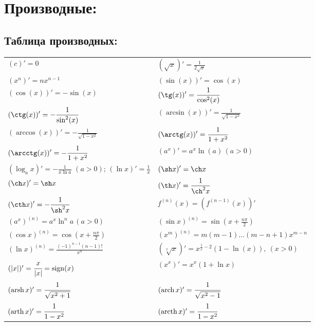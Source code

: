\documentclass[12pt, a6paper]{extarticle}
\DeclareMathOperator{\sign}{sign}
\DeclareMathOperator{\arch}{arch}
\DeclareMathOperator{\arsh}{arsh}
\DeclareMathOperator{\arth}{arth}
\DeclareMathOperator{\arcth}{arcth}
\begin{document}
\section{Производные:}
\subsection{Таблица производных:}
\begin{tabular}{ll}
$\displaystyle (c)' = 0 $                       &   $\displaystyle (\sqrt{x})'=\frac{1}{2\sqrt{x}}      $ \\
$\displaystyle (x^n)'=nx^{n-1}$                 &   $\displaystyle (\sin(x))'=\cos(x)                          $ \\
$\displaystyle (\cos(x))'=-\sin(x)$             &   $\displaystyle (\tg(x))'=\frac{1}{\cos^2(x)}               $ \\
$\displaystyle (\ctg(x))'=-\frac{1}{\sin^2(x)}$ &   $\displaystyle (\arcsin(x))'=\frac{1}{\sqrt{1-x^2}}  	     $ \\
$\displaystyle (\arccos(x))'=-\frac{1}{\sqrt{1-x^2}}  	$ &   $\displaystyle (\arctg(x))'=\frac{1}{1+x^2}  	   $ \\
$\displaystyle (\arcctg(x))'=-\frac{1}{1+x^2}  	$ &   $\displaystyle (a^x)'=a^x\ln(a) \, (a>0)     $ \\
$\displaystyle (\log_ax)'=-\frac{1}{x\ln a}\,\,(a>0);\,(\ln x)'=\frac{1}{x}  $ &  $\displaystyle (\sh x)'=\ch x  $ \\
$\displaystyle (\ch x)'=\sh x  $ &  $\displaystyle (\th x)'=\frac{1}{\ch^2 x}                                                        $ \\
$\displaystyle (\cth x)'=-\frac{1}{\sh^2 x}  $ &  $\displaystyle f^{(n)}(x)=(f^{(n-1)}(x))'                                       $ \\
$\displaystyle (a^x)^{(n)}=a^x \ln^n a \,(a>0)   $ &  $\displaystyle (\sin x)^{(n)} = \sin\left(x+\frac{n\pi}{2}\right)           $ \\
$\displaystyle (\cos x)^{(n)} = \cos\left(x+\frac{n\pi}{2}\right) $ &  $\displaystyle (x^m)^{(n)} = m(m-1)\dots(m-n+1)x^{m-n}     $ \\
$\displaystyle (\ln x)^{(n)} = \frac{(-1)^{n-1} (n-1)!}{x^n} $ &  $ \displaystyle(\sqrt[x]{x})' = x^{\frac{1}{x}-2} (1-\ln(x)), \ (x>0)$ \\
$(|x|)' = \cfrac{x}{|x|} = \sign(x) $ &  $ \left(x^x\right)' = x^x\left(1 + \ln x\right) $ \\
$(\arsh x)' = \cfrac{1}{\sqrt{x^2 + 1}} $ &  $ (\arch x)' = \cfrac{1}{\sqrt{x^2 - 1}}  $ \\
$(\arth x)' = \cfrac{1}{1 - x^2} $ &  $ (\arcth x)' = \cfrac{1}{1 - x^2} $ \\
\end{tabular}
\end{document}
